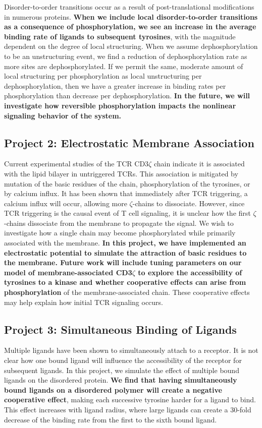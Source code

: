 \documentclass[onecolumn]{article}
\begin{document}
Disorder-to-order transitions occur as a result of post-translational modifications in numerous proteins. \textbf{When we include local disorder-to-order transitions as a consequence of phosphorylation, we see an increase in the average binding rate of ligands to subsequent tyrosines}, with the magnitude dependent on the degree of local structuring. When we assume dephosphorylation to be an unstructuring event, we find a reduction of dephosphorylation rate as more sites are dephosphorylated. If we permit the same, moderate amount of local structuring per phosphorylation as local unstructuring per dephosphorylation, then we have a greater increase in binding rates per phosphorylation than decrease per dephosphorylation. \textbf{In the future, we will investigate how reversible phosphorylation impacts the nonlinear signaling behavior of the system.}

\subsection*{Project 2: Electrostatic Membrane Association}

Current experimental studies of the TCR CD3$\zeta$ chain indicate it is associated with the lipid bilayer in untriggered TCRs. This association is mitigated by mutation of the basic residues of the chain, phosphorylation of the tyrosines, or by calcium influx. It has been shown that immediately after TCR triggering, a calcium influx will occur, allowing more $\zeta$-chains to dissociate. However, since TCR triggering is the causal event of T cell signaling, it is unclear how the first $\zeta$-chains dissociate from the membrane to propagate the signal. We wish to investigate how a single chain may become phosphorylated while primarily associated with the membrane. \textbf{In this project, we have implemented an electrostatic potential to simulate the attraction of basic residues to the membrane. Future work will include tuning parameters on our model of membrane-associated CD3$\zeta$ to explore the accessibility of tyrosines to a kinase and whether cooperative effects can arise from phosphorylation} of the membrane-associated chain. These cooperative effects may help explain how initial TCR signaling occurs.

\subsection*{Project 3: Simultaneous Binding of Ligands}

Multiple ligands have been shown to simultaneously attach to a receptor. It is not clear how one bound ligand will influence the accessibility of the receptor for subsequent ligands. In this project, we simulate the effect of multiple bound ligands on the disordered protein. \textbf{We find that having simultaneously bound ligands on a disordered polymer will create a negative cooperative effect}, making each successive tyrosine harder for a ligand to bind. This effect increases with ligand radius, where large ligands can create a 30-fold decrease of the binding rate from the first to the sixth bound ligand.
\end{document}

